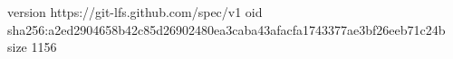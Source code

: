 version https://git-lfs.github.com/spec/v1
oid sha256:a2ed2904658b42c85d26902480ea3caba43afacfa1743377ae3bf26eeb71c24b
size 1156
